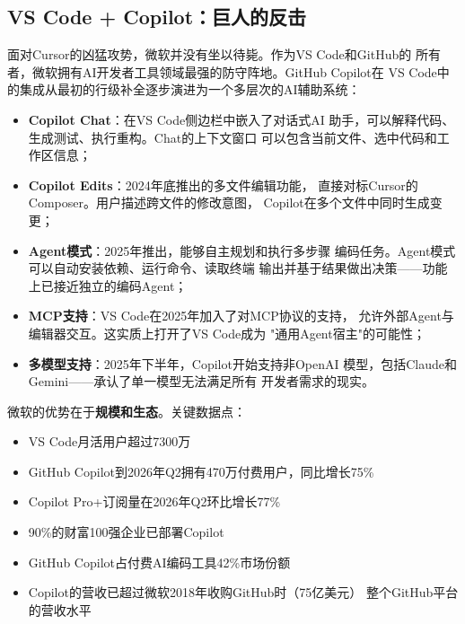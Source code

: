 \subsection{VS Code + Copilot：巨人的反击}
\label{subsec:vscode-copilot}

面对Cursor的凶猛攻势，微软并没有坐以待毙。作为VS Code和GitHub的
所有者，微软拥有AI开发者工具领域最强的防守阵地。GitHub Copilot在
VS Code中的集成从最初的行级补全逐步演进为一个多层次的AI辅助系统：

\begin{itemize}
  \item \textbf{Copilot Chat}：在VS Code侧边栏中嵌入了对话式AI
    助手，可以解释代码、生成测试、执行重构。Chat的上下文窗口
    可以包含当前文件、选中代码和工作区信息；
  \item \textbf{Copilot Edits}：2024年底推出的多文件编辑功能，
    直接对标Cursor的Composer。用户描述跨文件的修改意图，
    Copilot在多个文件中同时生成变更；
  \item \textbf{Agent模式}：2025年推出，能够自主规划和执行多步骤
    编码任务。Agent模式可以自动安装依赖、运行命令、读取终端
    输出并基于结果做出决策——功能上已接近独立的编码Agent；
  \item \textbf{MCP支持}：VS Code在2025年加入了对MCP协议的支持，
    允许外部Agent与编辑器交互。这实质上打开了VS Code成为
    "通用Agent宿主"的可能性；
  \item \textbf{多模型支持}：2025年下半年，Copilot开始支持非OpenAI
    模型，包括Claude和Gemini——承认了单一模型无法满足所有
    开发者需求的现实。
\end{itemize}

微软的优势在于\textbf{规模和生态}。关键数据点：

\begin{itemize}
  \item VS Code月活用户超过7300万
  \item GitHub Copilot到2026年Q2拥有470万付费用户，同比增长75\%
  \item Copilot Pro+订阅量在2026年Q2环比增长77\%
  \item 90\%的财富100强企业已部署Copilot
  \item GitHub Copilot占付费AI编码工具42\%市场份额
  \item Copilot的营收已超过微软2018年收购GitHub时（75亿美元）
    整个GitHub平台的营收水平
\end{itemize}

